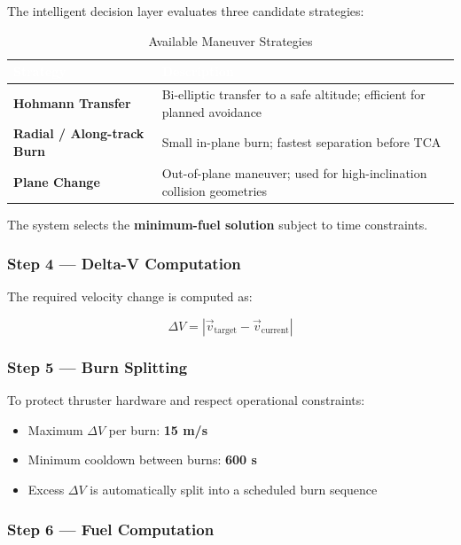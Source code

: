 \documentclass[11pt, a4paper]{article}
\begin{document}
The intelligent decision layer evaluates three candidate strategies:

\begin{table}[H]
\centering
\begin{tabularx}{\linewidth}{>{\bfseries}p{4cm} X}
\toprule
\rowcolor{spaceblue}\textcolor{white}{\textbf{Strategy}} & \textcolor{white}{\textbf{Description}} \\
\midrule
Hohmann Transfer & Bi-elliptic transfer to a safe altitude; efficient for planned avoidance \\
\midrule
Radial / Along-track Burn & Small in-plane burn; fastest separation before TCA \\
\midrule
Plane Change & Out-of-plane maneuver; used for high-inclination collision geometries \\
\bottomrule
\end{tabularx}
\caption{Available Maneuver Strategies}
\end{table}

The system selects the \textbf{minimum-fuel solution} subject to time constraints.

\subsubsection{Step 4 --- Delta-V Computation}

The required velocity change is computed as:

\[
  \Delta V = \left|\vec{v}_{\text{target}} - \vec{v}_{\text{current}}\right|
\]

\subsubsection{Step 5 --- Burn Splitting}

To protect thruster hardware and respect operational constraints:
\begin{itemize}[leftmargin=1.5cm]
  \item Maximum $\Delta V$ per burn: \textbf{15 m/s}
  \item Minimum cooldown between burns: \textbf{600 s}
  \item Excess $\Delta V$ is automatically split into a scheduled burn sequence
\end{itemize}

\subsubsection{Step 6 --- Fuel Computation}
\end{document}
